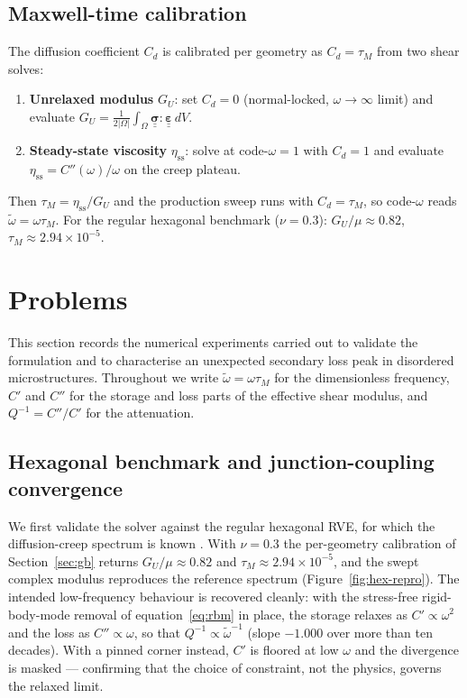 \documentclass[12pt]{article}
\newcommand{\tensor}[1]{\underline{\underline{\boldsymbol{#1}}}}
\begin{document}
\subsection{Maxwell-time calibration}

The diffusion coefficient $C_d$ is calibrated per geometry as $C_d = \tau_M$ from two shear solves:
\begin{enumerate}
    \item \textbf{Unrelaxed modulus} $G_U$: set $C_d = 0$ (normal-locked, $\omega \to \infty$ limit) and evaluate
    $G_U = \tfrac{1}{2|\Omega|}\int_\Omega \tensor{\sigma}:\tensor{\varepsilon}\, dV$.
    \item \textbf{Steady-state viscosity} $\eta_{\mathrm{ss}}$: solve at code-$\omega = 1$ with $C_d = 1$ and evaluate
    $\eta_{\mathrm{ss}} = C''(\omega)/\omega$ on the creep plateau.
\end{enumerate}
Then $\tau_M = \eta_{\mathrm{ss}}/G_U$ and the production sweep runs with $C_d = \tau_M$, so code-$\omega$ reads $\tilde{\omega} = \omega\tau_M$. For the regular hexagonal benchmark ($\nu = 0.3$): $G_U/\mu \approx 0.82$, $\tau_M \approx 2.94 \times 10^{-5}$.

\section{Problems}

This section records the numerical experiments carried out to validate the
formulation and to characterise an unexpected secondary loss peak in disordered
microstructures. Throughout we write $\tilde{\omega} = \omega\tau_M$ for the
dimensionless frequency, $C'$ and $C''$ for the storage and loss parts of the
effective shear modulus, and $Q^{-1} = C''/C'$ for the attenuation.

\subsection{Hexagonal benchmark and junction-coupling convergence}
\label{sec:prob-hex}

We first validate the solver against the regular hexagonal RVE, for which the
diffusion-creep spectrum is known \citep{rudge_viscoelastic_2025}. With
$\nu = 0.3$ the per-geometry calibration of Section~\ref{sec:gb} returns
$G_U/\mu \approx 0.82$ and $\tau_M \approx 2.94\times10^{-5}$, and the swept
complex modulus reproduces the reference spectrum (Figure~\ref{fig:hex-repro}).
The intended low-frequency behaviour is recovered cleanly: with the stress-free
rigid-body-mode removal of equation~\eqref{eq:rbm} in place, the storage relaxes
as $C' \propto \omega^2$ and the loss as $C'' \propto \omega$, so that
$Q^{-1} \propto \tilde{\omega}^{-1}$ (slope $-1.000$ over more than ten decades).
With a pinned corner instead, $C'$ is floored at low $\omega$ and the divergence
is masked --- confirming that the choice of constraint, not the physics, governs
the relaxed limit.
\end{document}
